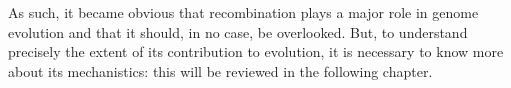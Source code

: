 As such, it became obvious that recombination plays a major role in genome evolution and that it should, in no case, be overlooked.
But, to understand precisely the extent of its contribution to evolution, it is necessary to know more about its mechanistics: this will be reviewed in the following chapter.


%
%
%
%
%
%
%










